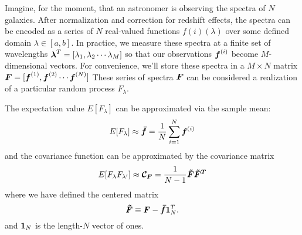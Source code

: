 Imagine, for the moment, that an astronomer is observing the spectra of
$N$ galaxies.  After normalization and correction for redshift effects,
the spectra can be encoded as a series of $N$ real-valued functions
$f{(i)}(\lambda)$ over some defined domain $\lambda \in [a, b]$.
In practice, we measure these spectra at a finite set of wavelengths
$\boldsymbol{\lambda}^T = [\lambda_1, \lambda_2 \cdots \lambda_M]$ so that
our observations $\boldsymbol{f}^{(i)}$ become $M$-dimensional vectors.  For
convenience, we'll store these spectra in a $M \times N$ matrix
$\boldsymbol{F} = [\boldsymbol{f}^{(1)}, \boldsymbol{f}^{(2)} \cdots \boldsymbol{f}^{(N)}]$
These series of spectra $\boldsymbol{F}$ 
can be considered a realization of a particular
random process $F_\lambda$.

The expectation value $E[F_\lambda]$ can be approximated via the sample mean:
\begin{equation}
  E[F_\lambda] \approx \boldsymbol{\bar{f}}
  = \frac{1}{N} \sum_{i=1}^N \boldsymbol{f}^{(i)}
\end{equation}
and the covariance function can be approximated by the covariance matrix
\begin{equation}
  \label{eq:mat_corr_def}
  E[F_\lambda F_{\lambda^\prime}] \approx 
  \boldsymbol{\mathcal{C}_F} = \frac{1}{N - 1} \boldsymbol{\tilde{F}} \boldsymbol{\tilde{F}^T}
\end{equation}
where we have defined the centered matrix
\begin{equation}
  \boldsymbol{\tilde{F}} \equiv \boldsymbol{F} - \boldsymbol{\bar{f}}\boldsymbol{1}_N^T.
\end{equation}
and $\boldsymbol{1}_N$ is the length-$N$ vector of ones.

